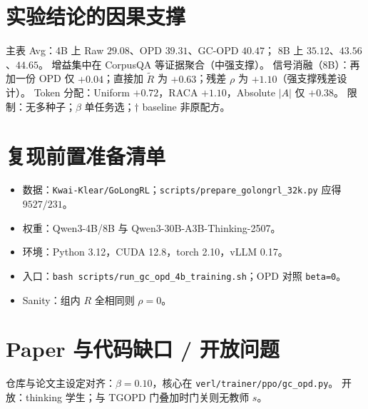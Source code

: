 \documentclass[11pt,a4paper]{ctexart}
\begin{document}
\section{实验结论的因果支撑}
主表 Avg：4B 上 Raw $29.08$、OPD $39.31$、GC-OPD $\mathbf{40.47}$；
8B 上 $35.12$、$43.56$、$\mathbf{44.65}$。
增益集中在 CorpusQA 等证据聚合（中强支撑）。
信号消融（8B）：再加一份 OPD 仅 $+0.04$；直接加 $\tilde R$ 为 $+0.63$；残差 $\rho$ 为 $+1.10$（强支撑残差设计）。
Token 分配：Uniform $+0.72$，RACA $+1.10$，Absolute $|A|$ 仅 $+0.38$。
限制：无多种子；$\beta$ 单任务选；$\dagger$ baseline 非原配方。

\section{复现前置准备清单}
\begin{itemize}
\item 数据：\texttt{Kwai-Klear/GoLongRL}；\texttt{scripts/prepare\_golongrl\_32k.py} 应得 $9527/231$。
\item 权重：Qwen3-4B/8B 与 Qwen3-30B-A3B-Thinking-2507。
\item 环境：Python 3.12，CUDA 12.8，torch 2.10，vLLM 0.17。
\item 入口：\texttt{bash scripts/run\_gc\_opd\_4b\_training.sh}；OPD 对照 \texttt{beta=0}。
\item Sanity：组内 $R$ 全相同则 $\rho=0$。
\end{itemize}

\section{Paper 与代码缺口 / 开放问题}
仓库与论文主设定对齐：$\beta=0.10$，核心在 \texttt{verl/trainer/ppo/gc\_opd.py}。
开放：thinking 学生；与 TGOPD 门叠加时门关则无教师 $s$。
\end{document}
